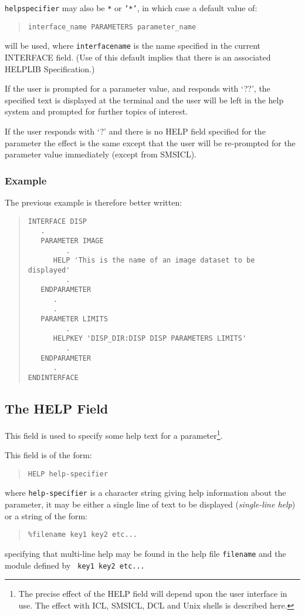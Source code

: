 \documentclass[twoside,11pt]{article}
\newcommand{\xlabel}[1]{}
\renewcommand{\_}{\texttt{\symbol{95}}}
\begin{document}
\texttt{help\_specifier}  may also be \texttt{*} or \texttt{'*'}, in which case a
default value of:
\begin{quote} \begin{verbatim}
interface_name PARAMETERS parameter_name
\end{verbatim} \end{quote}
will be used, where \texttt{interface\_name} is the name specified in the
current INTERFACE field.
(Use of this default implies that there is an associated HELPLIB Specification.)

If the user is prompted for a parameter value, and responds with `??',
the specified text is displayed at the terminal and the user will be left in 
the help system and prompted for further topics of interest. 

If the user responds with `?' and there is no HELP field specified for the
parameter the effect is the same except that the user 
will be re-prompted for the parameter value immediately (except from SMSICL).

\subsubsection*{Example}
The previous example is therefore better written:
\begin{quote} \begin{verbatim}
INTERFACE DISP
   .
   PARAMETER IMAGE
         .
      HELP 'This is the name of an image dataset to be displayed'
         .
   ENDPARAMETER
      .
      .
   PARAMETER LIMITS
         .
      HELPKEY 'DISP_DIR:DISP DISP PARAMETERS LIMITS'
         .
   ENDPARAMETER
      .
ENDINTERFACE
\end{verbatim} \end{quote}

\subsection{The HELP Field\xlabel{the_help_field}}

This field is used to specify some help text for a parameter\footnote{
The precise effect of the HELP field will depend upon the user interface in use.
The effect with ICL, SMSICL, DCL and Unix shells is described here.}.

This field is of the form:
\begin{quote} \begin{verbatim}
HELP help-specifier
\end{verbatim} \end{quote}
where \texttt{help-specifier} is a character string giving help information about 
the parameter, it may be either a single line of text to be displayed
({\em single-line help}) or a string of the form:
\begin{quote} \begin{verbatim}
%filename key1 key2 etc...
\end{verbatim} \end{quote}
specifying that multi-line help may be found in the help file 
\texttt{filename} and the module defined by \texttt{ key1 key2 etc...}
\end{document}
